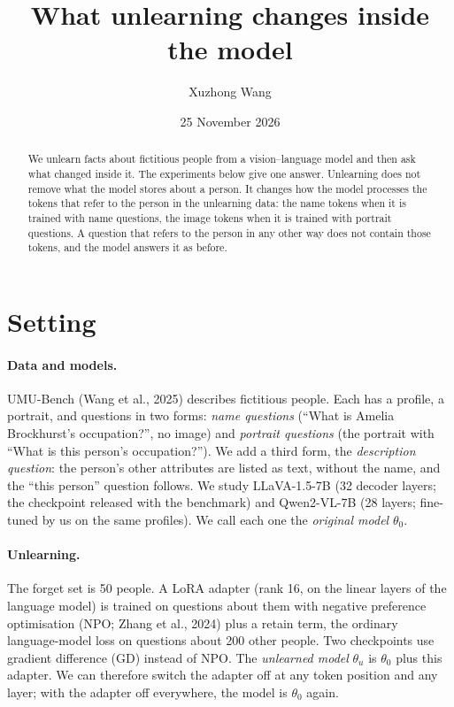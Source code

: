 \documentclass[11pt]{article}
\title{What unlearning changes inside the model}
\author{Xuzhong Wang}
\date{25 November 2026}
\newcommand{\thorig}{\theta_0}
\newcommand{\thunl}{\theta_u}
\begin{document}
\maketitle

\begin{abstract}
We unlearn facts about fictitious people from a vision--language model and then ask what
changed inside it. The experiments below give one answer. Unlearning does not remove what the
model stores about a person. It changes how the model processes the tokens that refer to the
person in the unlearning data: the name tokens when it is trained with name questions, the
image tokens when it is trained with portrait questions. A question that refers to the person
in any other way does not contain those tokens, and the model answers it as before.
\end{abstract}

\section{Setting}
\label{sec:mech-setting}

\paragraph{Data and models.}
UMU-Bench (Wang et al., 2025) describes fictitious people. Each has a profile, a portrait, and
questions in two forms: \emph{name questions} (``What is Amelia Brockhurst's occupation?'', no
image) and \emph{portrait questions} (the portrait with ``What is this person's
occupation?''). We add a third form, the \emph{description question}: the person's other
attributes are listed as text, without the name, and the ``this person'' question follows. We
study LLaVA-1.5-7B (32 decoder layers; the checkpoint released with the benchmark) and
Qwen2-VL-7B (28 layers; fine-tuned by us on the same profiles). We call each one the
\emph{original model} $\thorig$.

\paragraph{Unlearning.}
The forget set is 50 people. A LoRA adapter (rank 16, on the linear layers of the language
model) is trained on questions about them with negative preference optimisation (NPO; Zhang et
al., 2024) %
plus a retain term, the ordinary language-model loss on questions about 200 other people. Two
checkpoints use gradient difference (GD) instead of NPO. The \emph{unlearned model} $\thunl$ is
$\thorig$ plus this adapter. We can therefore switch the adapter off at any token position and
any layer; with the adapter off everywhere, the model is $\thorig$ again.
\end{document}
